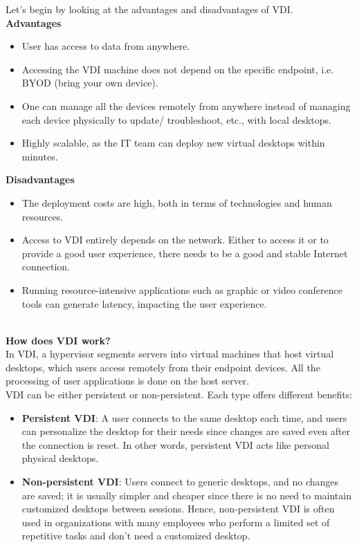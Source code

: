\documentclass[a4paper,12pt, final]{report}
\begin{document}
\newpage

\noindent Let's begin by looking at the advantages and disadvantages of VDI.\\

\noindent \textbf{Advantages}
\begin{itemize}
    \item User has access to data from anywhere.
    \item Accessing the VDI machine does not depend on the specific endpoint, i.e. BYOD (bring your own device).
    \item One can manage all the devices remotely from anywhere instead of managing each device physically to update/ troubleshoot, etc., with local desktops.
    \item Highly scalable, as the IT team can deploy new virtual desktops within minutes.
\end{itemize}

\noindent \textbf{Disadvantages}
\begin{itemize}
    \item The deployment costs are high, both in terms of technologies and human resources.
    \item Access to VDI entirely depends on the network. Either to access it or to provide a good user experience, there needs to be a good and stable Internet connection.
    \item Running resource-intensive applications such as graphic or video conference tools can generate latency, impacting the user experience.
\end{itemize}\\

\noindent \textbf{How does VDI work?}\\

\noindent In VDI, a hypervisor segments servers into virtual machines that host virtual desktops, which users access remotely from their endpoint devices. All the processing of user applications is done on the host server.\\

\noindent VDI can be either persistent or non-persistent. Each type offers different benefits:

\begin{itemize}
    \item \textbf{Persistent VDI}: A user connects to the same desktop each time, and users can personalize the desktop for their needs since changes are saved even after the connection is reset. In other words, persistent VDI acts like personal physical desktops.
    \item \textbf{Non-persistent VDI}: Users connect to generic desktops, and no changes are saved; it is usually simpler and cheaper since there is no need to maintain customized desktops between sessions. Hence, non-persistent VDI is often used in organizations with many employees who perform a limited set of repetitive tasks and don't need a customized desktop.
\end{itemize}
\end{document}

